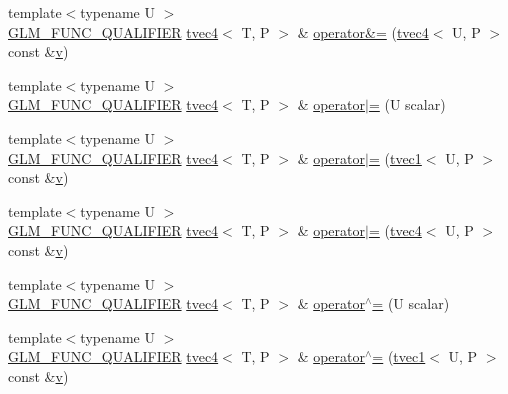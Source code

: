 \begin{DoxyCompactItemize}
\item 
{\footnotesize template$<$typename U $>$ }\\\mbox{\hyperlink{setup_8hpp_a33fdea6f91c5f834105f7415e2a64407}{G\+L\+M\+\_\+\+F\+U\+N\+C\+\_\+\+Q\+U\+A\+L\+I\+F\+I\+ER}} \mbox{\hyperlink{structglm_1_1tvec4}{tvec4}}$<$ T, P $>$ \& \mbox{\hyperlink{structglm_1_1tvec4_a2513499d4dc631ebfc50913c7068caef}{operator\&=}} (\mbox{\hyperlink{structglm_1_1tvec4}{tvec4}}$<$ U, P $>$ const \&\mbox{\hyperlink{glad_8h_a14cfbe2fc2234f5504618905b69d1e06}{v}})
\item 
{\footnotesize template$<$typename U $>$ }\\\mbox{\hyperlink{setup_8hpp_a33fdea6f91c5f834105f7415e2a64407}{G\+L\+M\+\_\+\+F\+U\+N\+C\+\_\+\+Q\+U\+A\+L\+I\+F\+I\+ER}} \mbox{\hyperlink{structglm_1_1tvec4}{tvec4}}$<$ T, P $>$ \& \mbox{\hyperlink{structglm_1_1tvec4_ae8690e557100d8299871ab1809e5dea7}{operator$\vert$=}} (U scalar)
\item 
{\footnotesize template$<$typename U $>$ }\\\mbox{\hyperlink{setup_8hpp_a33fdea6f91c5f834105f7415e2a64407}{G\+L\+M\+\_\+\+F\+U\+N\+C\+\_\+\+Q\+U\+A\+L\+I\+F\+I\+ER}} \mbox{\hyperlink{structglm_1_1tvec4}{tvec4}}$<$ T, P $>$ \& \mbox{\hyperlink{structglm_1_1tvec4_a8f18846441fd6ad08154311274a37fd8}{operator$\vert$=}} (\mbox{\hyperlink{structglm_1_1tvec1}{tvec1}}$<$ U, P $>$ const \&\mbox{\hyperlink{glad_8h_a14cfbe2fc2234f5504618905b69d1e06}{v}})
\item 
{\footnotesize template$<$typename U $>$ }\\\mbox{\hyperlink{setup_8hpp_a33fdea6f91c5f834105f7415e2a64407}{G\+L\+M\+\_\+\+F\+U\+N\+C\+\_\+\+Q\+U\+A\+L\+I\+F\+I\+ER}} \mbox{\hyperlink{structglm_1_1tvec4}{tvec4}}$<$ T, P $>$ \& \mbox{\hyperlink{structglm_1_1tvec4_aabde2042533b8cf0b03d1e75de75d910}{operator$\vert$=}} (\mbox{\hyperlink{structglm_1_1tvec4}{tvec4}}$<$ U, P $>$ const \&\mbox{\hyperlink{glad_8h_a14cfbe2fc2234f5504618905b69d1e06}{v}})
\item 
{\footnotesize template$<$typename U $>$ }\\\mbox{\hyperlink{setup_8hpp_a33fdea6f91c5f834105f7415e2a64407}{G\+L\+M\+\_\+\+F\+U\+N\+C\+\_\+\+Q\+U\+A\+L\+I\+F\+I\+ER}} \mbox{\hyperlink{structglm_1_1tvec4}{tvec4}}$<$ T, P $>$ \& \mbox{\hyperlink{structglm_1_1tvec4_a7866bb2f3c4496c7b216f4d9c74b6bf7}{operator$^\wedge$=}} (U scalar)
\item 
{\footnotesize template$<$typename U $>$ }\\\mbox{\hyperlink{setup_8hpp_a33fdea6f91c5f834105f7415e2a64407}{G\+L\+M\+\_\+\+F\+U\+N\+C\+\_\+\+Q\+U\+A\+L\+I\+F\+I\+ER}} \mbox{\hyperlink{structglm_1_1tvec4}{tvec4}}$<$ T, P $>$ \& \mbox{\hyperlink{structglm_1_1tvec4_aeb460e85abbffbc0880712c2a32659a1}{operator$^\wedge$=}} (\mbox{\hyperlink{structglm_1_1tvec1}{tvec1}}$<$ U, P $>$ const \&\mbox{\hyperlink{glad_8h_a14cfbe2fc2234f5504618905b69d1e06}{v}})

\end{DoxyCompactItemize}
